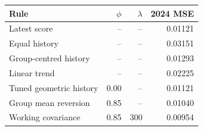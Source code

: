 \begin{tabular}{lrrr}
\toprule
Rule & $\phi$ & $\lambda$ & 2024 MSE \\
\midrule
Latest score & -- & -- & 0.01121 \\
Equal history & -- & -- & 0.03151 \\
Group-centred history & -- & -- & 0.01293 \\
Linear trend & -- & -- & 0.02225 \\
Tuned geometric history & 0.00 & -- & 0.01121 \\
Group mean reversion & 0.85 & -- & 0.01040 \\
Working covariance & 0.85 & 300 & 0.00954 \\
\bottomrule
\end{tabular}
